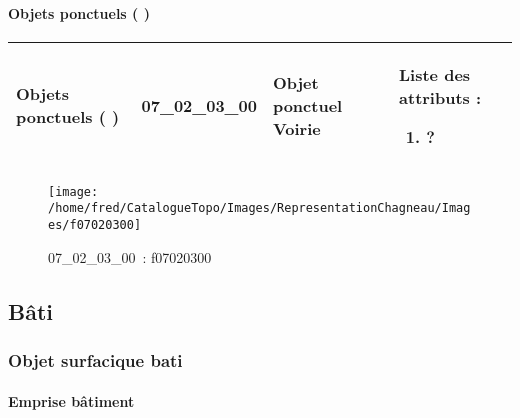 \documentclass[12pt,titlepage]{book}
\begin{document}
\paragraph{Objets ponctuels ( )}
\noindent
\vspace{\baselineskip}

\renewcommand{\arraystretch}{1.2}
\begin{supertabular}{|p{10cm}|c|p{13cm}|p{12cm}|}
 Objets ponctuels ( ) & 07\_02\_03\_00 & Objet ponctuel Voirie & Liste des attributs :
\begin{enumerate}
  \item ?\end{enumerate}
\\
\hline
\end{supertabular}
\begin{figure}[h!]
  \hfill         %
  \begin{minipage}[t]{3cm}
    \begin{center}
      \texttt{[image: /home/fred/CatalogueTopo/Images/RepresentationChagneau/Images/f07020300]}
      \caption[~07\_02\_03\_00]{\small{07\_02\_03\_00~:} \tiny{f07020300}}\label{f07020300}
    \end{center}
  \end{minipage}
\end{figure}
\subsection{Bâti}
\subsubsection{\large Objet surfacique bati}
\paragraph{Emprise bâtiment}
\noindent
\vspace{\baselineskip}
\end{document}
